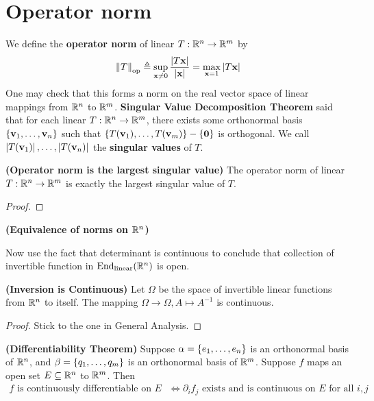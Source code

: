 \documentclass{report}
\begin{document}
\section{Operator norm}
We define the \textbf{operator norm} of linear $T: \mathbb{R}^n\rightarrow \mathbb{R}^m$ by 
\begin{align*}
\left\| T \right\|_{\operatorname{op}}\triangleq \sup_{\textbf{x}\neq 0} \frac{\left|T\textbf{x}\right|}{\left|\textbf{x}\right|}=  \max_{\textbf{x}=1} \left|T\textbf{x}\right|
\end{align*}
One may check that this forms a norm on the real vector space of linear mappings from $\mathbb{R}^n$ to  $\mathbb{R}^m$. \textbf{Singular Value Decomposition Theorem} said that for each linear $T :\mathbb{R}^n\rightarrow \mathbb{R}^m$, there exists some orthonormal basis $\left\{ \textbf{v}_1,\dots ,\textbf{v}_n \right\}$ such that $\left\{ T(\textbf{v}_1),\dots ,T(\textbf{v}_m) \right\}- \left\{ \textbf{0} \right\}$ is orthogonal. We call $\left|T(\textbf{v}_1)\right|,\dots ,\left|T(\textbf{v}_n)\right|$ the \textbf{singular values} of $T$. 
\begin{theorem}
\textbf{(Operator norm is the largest singular value)} The operator norm of linear $T:\mathbb{R}^n\rightarrow \mathbb{R}^m$ is exactly the largest singular value of $T$. 
\end{theorem}
\begin{proof}

\end{proof}
\begin{theorem}
\textbf{(Equivalence of norms on $\mathbb{R}^n$)}
\end{theorem}
Now use the fact that determinant is continuous to conclude that collection of invertible function in $\operatorname{End}_{\text{linear}}(\mathbb{R}^n)$ is open. 
\begin{theorem}
\label{THIic}
\textbf{(Inversion is Continuous)} Let $\Omega$ be the space of invertible linear functions from $\mathbb{R}^n$ to itself. The mapping $\Omega\rightarrow \Omega,A \mapsto  A^{-1}$ is continuous. 
\end{theorem}
\begin{proof}
Stick to the one in General Analysis. 
\end{proof}
\begin{theorem}
\label{DT}
\textbf{(Differentiability Theorem)} Suppose  $\alpha =\left\{ e_1,\dots ,e_n \right\}$ is an orthonormal basis of $\mathbb{R}^n$, and $\beta =\left\{ q_1,\dots ,q_m \right\}$ is an orthonormal basis of  $\mathbb{R}^m$. Suppose  $f$ maps an open set $E\subseteq\mathbb{R}^n$ to $\mathbb{R}^m$.  Then  
\begin{align*}
f\text{ is continuously differentiable on $E$ }\iff \partial_if_j\text{ exists and is continuous on $E$ for all $i,j$ }
\end{align*}
\end{theorem}
\end{document}

